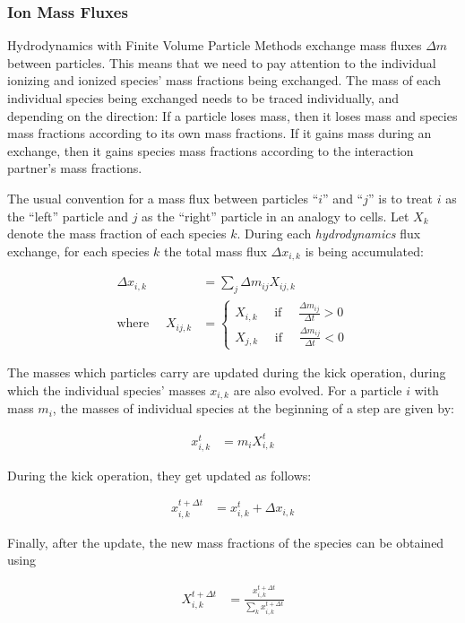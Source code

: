 \subsubsection{Ion Mass Fluxes}

Hydrodynamics with Finite Volume Particle Methods exchange mass fluxes $\Delta m$ between particles.
This means that we need to pay attention to the individual ionizing and ionized species' mass
fractions being exchanged. The mass of each individual species being exchanged needs to be traced
individually, and depending on the direction: If a particle loses mass, then it loses mass and
species mass fractions according to its own mass fractions. If it gains mass during an exchange,
then it gains species mass fractions according to the interaction partner's mass fractions.

The usual convention for a mass flux between particles ``$i$'' and ``$j$'' is to treat $i$ as the
``left'' particle and $j$ as the ``right'' particle in an analogy to cells. Let $X_k$ denote the
mass fraction of each species $k$. During each \emph{hydrodynamics} flux exchange, for each species
$k$ the total mass flux $\Delta x_{i,k}$ is being accumulated:

\begin{align}
\Delta x_{i,k} &= \sum_j \Delta m_{ij} X_{ij,k}\\
\text{where }\quad X_{ij,k} &=
	\begin{cases}
		X_{i,k} \quad \text{ if } \quad \frac{\Delta m_{ij}}{\Delta t} > 0 \\
		X_{j,k} \quad \text{ if } \quad \frac{\Delta m_{ij}}{\Delta t} < 0
	\end{cases}
\end{align}

The masses which particles carry are updated during the kick operation, during which the individual
species' masses $x_{i,k}$ are also evolved. For a particle $i$ with mass $m_i$, the masses of
individual species at the beginning of a step are given by:

\begin{align}
    x_{i,k}^{t} &= m_i X_{i,k}^{t}
\end{align}

During the kick operation, they get updated as follows:

\begin{align}
    x_{i,k}^{t + \Delta t} &= x_{i,k}^{t} + \Delta x_{i,k}
\end{align}

Finally, after the update, the new mass fractions of the species can be obtained using

\begin{align}
X_{i,k}^{t + \Delta t} &= \frac{x_{i,k}^{t + \Delta t}}{\sum_k x_{i,k}^{t + \Delta t}}
\end{align}



